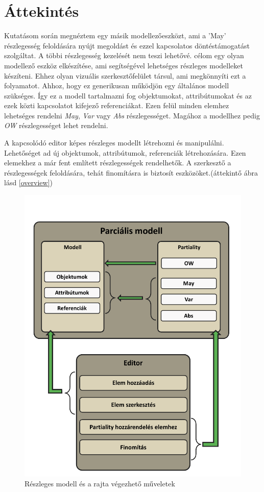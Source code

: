 \chapter{Áttekintés}


Kutatásom során megnéztem egy másik modellezőeszközt, ami a 'May' részlegesség feloldására nyújt megoldást és ezzel kapcsolatos döntéstámogatást szolgáltat\cite{Michalis}. A többi részlegesség kezelését nem teszi lehetővé. célom egy olyan modellező eszköz elkészítése, ami segítségével lehetséges részleges modelleket készíteni. Ehhez olyan vizuális szerkesztőfelület társul, ami megkönnyíti ezt a folyamatot. Ahhoz, hogy ez generikusan működjön egy általános modell szükséges. Így ez a modell tartalmazni fog objektumokat, attribútumokat és az ezek közti kapcsolatot kifejező referenciákat. Ezen felül minden elemhez lehetséges rendelni \textit{May}, \textit{Var} vagy \textit{Abs} részlegességet. Magához a modellhez pedig \textit{OW} részlegességet lehet rendelni.
\par
A kapcsolódó editor képes részleges modellt létrehozni és manipulálni. Lehetőséget ad új objektumok, attribútumok, referenciák létrehozására. Ezen elemekhez a már fent említett részlegességek rendelhetők. A szerkesztő a részlegességek feloldására, tehát finomításra is biztosít eszközöket.(áttekintő ábra lásd \autoref{overview})



\begin{figure}[!ht]
	\includegraphics[width=150mm]{figures/overview.pdf}
	\caption{Részleges modell és a rajta végezhető műveletek} 
	\label{overview}
\end{figure}

